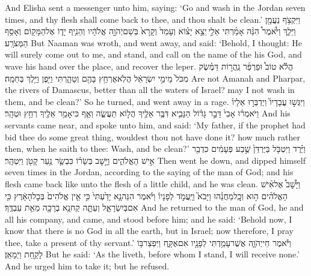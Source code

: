 {And Elisha sent a messenger unto him, saying: ‘Go and wash in the Jordan seven times, and thy flesh shall come back to thee, and thou shalt be clean.’}
{וַיִּקְצֹ֥ף נַעֲמָ֖ן וַיֵּלַ֑ךְ וַיֹּ֩אמֶר֩ הִנֵּ֨ה אָמַ֜רְתִּי אֵלַ֣י \legarmeh  יֵצֵ֣א יָצ֗וֹא וְעָמַד֙ וְקָרָא֙ בְּשֵׁם\maqqaf יְהֹוָ֣ה אֱלֹהָ֔יו וְהֵנִ֥יף יָד֛וֹ אֶל\maqqaf הַמָּק֖וֹם וְאָסַ֥ף הַמְּצֹרָֽע׃}
{But Naaman was wroth, and went away, and said: ‘Behold, I thought: He will surely come out to me, and stand, and call on the name of the \lord\space his God, and wave his hand over the place, and recover the leper.}
{הֲלֹ֡א טוֹב֩  וּפַרְפַּ֜ר נַֽהֲר֣וֹת דַּמֶּ֗שֶׂק מִכֹּל֙ מֵימֵ֣י יִשְׂרָאֵ֔ל הֲלֹֽא\maqqaf אֶרְחַ֥ץ בָּהֶ֖ם וְטָהָ֑רְתִּי וַיִּ֖פֶן וַיֵּ֥לֶךְ בְּחֵמָֽה׃}
{Are not Amanah and Pharpar, the rivers of Damascus, better than all the waters of Israel? may I not wash in them, and be clean?’ So he turned, and went away in a rage.}
{וַיִּגְּשׁ֣וּ עֲבָדָיו֮ וַיְדַבְּר֣וּ אֵלָיו֒ וַיֹּאמְר֗וּ אָבִי֙ דָּבָ֣ר גָּד֗וֹל הַנָּבִ֛יא דִּבֶּ֥ר אֵלֶ֖יךָ הֲל֣וֹא תַעֲשֶׂ֑ה וְאַ֛ף כִּי\maqqaf אָמַ֥ר אֵלֶ֖יךָ רְחַ֥ץ וּטְהָֽר׃}
{And his servants came near, and spoke unto him, and said: ‘My father, if the prophet had bid thee do some great thing, wouldest thou not have done it? how much rather then, when he saith to thee: Wash, and be clean?’}
{וַיֵּ֗רֶד וַיִּטְבֹּ֤ל בַּיַּרְדֵּן֙ שֶׁ֣בַע פְּעָמִ֔ים כִּדְבַ֖ר אִ֣ישׁ הָאֱלֹהִ֑ים וַיָּ֣שׇׁב בְּשָׂר֗וֹ כִּבְשַׂ֛ר נַ֥עַר קָטֹ֖ן וַיִּטְהָֽר׃}
{Then went he down, and dipped himself seven times in the Jordan, according to the saying of the man of God; and his flesh came back like unto the flesh of a little child, and he was clean.}
{וַיָּ֩שׇׁב֩ אֶל\maqqaf אִ֨ישׁ הָאֱלֹהִ֜ים ה֣וּא וְכׇֽל\maqqaf מַחֲנֵ֗הוּ וַיָּבֹא֮ וַיַּֽעֲמֹ֣ד לְפָנָיו֒ וַיֹּ֗אמֶר הִנֵּה\maqqaf נָ֤א יָדַ֙עְתִּי֙ כִּ֣י אֵ֤ין אֱלֹהִים֙ בְּכׇל\maqqaf הָאָ֔רֶץ כִּ֖י אִם\maqqaf בְּיִשְׂרָאֵ֑ל וְעַתָּ֛ה קַח\maqqaf נָ֥א בְרָכָ֖ה מֵאֵ֥ת עַבְדֶּֽךָ׃}
{And he returned to the man of God, he and all his company, and came, and stood before him; and he said: ‘Behold now, I know that there is no God in all the earth, but in Israel; now therefore, I pray thee, take a present of thy servant.’}
{וַיֹּ֕אמֶר חַי\maqqaf יְהֹוָ֛ה אֲשֶׁר\maqqaf עָמַ֥דְתִּי לְפָנָ֖יו אִם\maqqaf אֶקָּ֑ח וַיִּפְצַר\maqqaf בּ֥וֹ לָקַ֖חַת וַיְמָאֵֽן׃}
{But he said: ‘As the \lord\space liveth, before whom I stand, I will receive none.’ And he urged him to take it; but he refused.}
